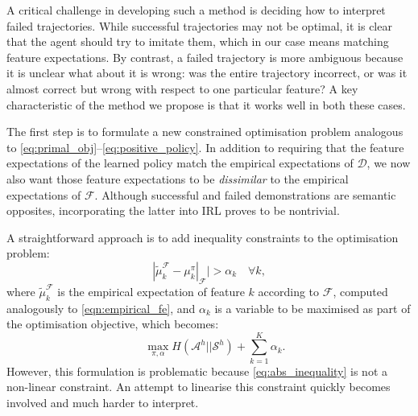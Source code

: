 \documentclass[a4paper,11pt]{report}
\begin{document}
A critical challenge in developing such a method is deciding how to interpret failed trajectories.  While successful trajectories may not be optimal, it is clear that the agent should try to imitate them, which in our case means matching feature expectations.  By contrast, a failed trajectory is more ambiguous because it is unclear what about it is wrong: was the entire trajectory incorrect, or was it almost correct but wrong with respect to one particular feature? A key characteristic of the method we propose is that it works well in both these cases.


The first step is to formulate a new constrained optimisation problem analogous to \eqref{eq:primal_obj}--\eqref{eq:positive_policy}. In addition to requiring that the feature expectations of the learned policy match the empirical expectations of $\mathcal{D}$, we now also want those feature expectations to be \emph{dissimilar} to the empirical expectations of $\mathcal{F}$. Although successful and failed demonstrations are semantic opposites, incorporating the latter into IRL proves to be nontrivial.

A straightforward approach is to add inequality constraints to the optimisation problem:
	\begin{equation}
        \label{eq:abs_inequality}
	|\widetilde{\mu}^{\mathcal{F}}_k  - \mu^{\pi}_k|_{\mathcal{F}}| > \alpha_k \quad\forall k,
	\end{equation} 
where $\widetilde{\mu}^{\mathcal{F}}_k$ is the empirical expectation of feature $k$ according to $\mathcal{F}$, computed analogously to \eqref{eqn:empirical_fe}, and $\alpha_k$ is a variable to be maximised as part of the optimisation objective, which becomes:
	\begin{equation}
		\quad\max\limits_{\pi,\alpha} H(\mathcal{A}^h||\mathcal{S}^h) + \sum^K_{k=1} \alpha_k.
	\end{equation}
However, this formulation is problematic because \eqref{eq:abs_inequality} is not a non-linear constraint. An attempt to linearise this constraint quickly becomes involved and much harder to interpret.
\end{document}
